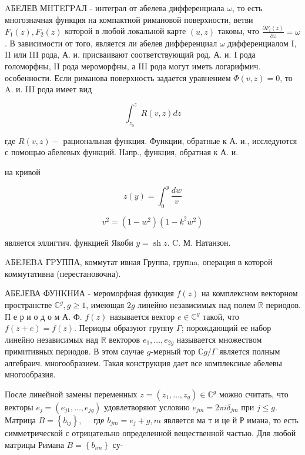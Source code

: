 \documentclass[10pt]{article}
\begin{document}
AБEЛЕВ МHTEГPАЛ - интеграл от абелева дифференциала $\omega$, то есть многозначная функция на компактной римановой поверхности, ветви $F_{1}(z), F_{2}(z)$ которой в любой локальной карте $(u, z)$ таковы, что $\frac{\partial F_{i}(z)}{\partial z}=\omega$. В зависимости от того, является ли абелев дифференциал $\omega$ дифференциалом I, II или III рода, А. и. присваивают соответствующий род. А. и. I рода голоморфны, II рода мероморфны, а III рода могут иметь логарифмич. особенности. Если риманова поверхность задается уравнением $\Phi(v, z)=0$, то A. и. III рода имеет вид



\[

\int_{z_{0}}^{z} R(v, z) d z

\]



где $R(v, z)-$ рациональная функция. Функции, обратные к А. и., исследуются с помощью абелевых функций. Напр., функция, обратная к А. и.



на кривой



\[

z(y)=\int_{0}^{y} \frac{d w}{v}

\]



\[

v^{2}=\left(1-w^{2}\right)\left(1-k^{2} w^{2}\right)

\]



является эллигтич. функцией Якоби $y=\operatorname{sh} z$. C. М. Натанзон.



AБEJEBA ГPУППА, коммутат ивная Группа, групna, операция в которой коммутативна (перестановочна).



АБЕJЕВА ФУНKНИА - мероморфная функция $f(z)$ на комплексном векторном пространстве $\mathbb{C}^{g}, g \geqslant 1$, имеющая $2 g$ линейно независимых над полем $\mathbb{R}$ периодов. П е р и о д о м А. Ф. $f(z)$ называется вектор $e \in \mathbb{C}^{g}$ такой, что $f(z+e)=f(z)$. Периоды образуют группу $\Gamma$; порождающий ее набор линейно независимых над $\mathbb{R}$ векторов $e_{1}, \ldots, e_{2 g}$ называется множеством примитивных периодов. В этом случае $g$-мерный тор $\mathbb{C} g / \Gamma$ является полным алгебраич. многообразием. Такая конструкция дает все комплексные абелевы многообразия.



После линейной замены переменных $z=\left(z_{1}, \ldots, z_{g}\right) \in \mathbb{C}^{g}$ можно считать, что векторы $e_{j}=\left(e_{j 1}, \ldots, e_{j g}\right)$ удовлетворяют условию $e_{j m}=2 \pi i \delta_{j m}$ при $j \leqslant g . \quad$ Матрица $B=\left\{b_{i j}\right\}, \quad$ где $b_{j m}=e_{j}+g, m$ является ма т и це й Р имана, то есть симметрической с отрицательно определенной вещественной частью. Для любой матрицы Римана $B=\left\{b_{i m}\right\}$ су-
\end{document}
